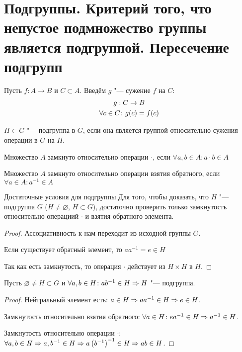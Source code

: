 \section{Подгруппы. Критерий того, что непустое подмножество группы является подгруппой. Пересечение подгрупп}
\begin{Def}
	Пусть $f: A \to B$ и $C \subset A$. Введём $g$ "--- сужение $f$ на $C$:
	\begin{gather*}
	g: C \rightarrow B \\
	\forall c \in C\colon g(c) = f(c)
	\end{gather*}
\end{Def}

\begin{Def}
	$H \subset G$ "--- подгруппа в $G$, если она является группой относительно сужения операции в $G$ на $H$.
\end{Def}


\begin{Def}
	Множество $A$ замкнуто относительно операции $\cdot$, если $\forall a, b \in A \colon a \cdot b \in A$

	Множество $A$ замкнуто относительно операции взятия обратного, если $\forall a \in A \colon a^{-1} \in A$ \\
\end{Def}

\begin{theorem}{Достаточные условия для подгруппы}
Для того, чтобы доказать, что $H$ "--- подгруппа $G$ ($H \neq \varnothing$, $H \subset G$), достаточно проверить только замкнутость относительно операциий $\cdot$ и взятия обратного элемента. \\
\end{theorem}
\begin{proof}
Ассоциативность к нам переходит из исходной группы $G$.

Если существует обратный элемент, то $a a^{-1} = e \in H$

Так как есть замкнутость, то операция $\cdot$ действует из $H \times H$ в $H$.
\end{proof}

\begin{conseq}
Пусть $\varnothing \ne H \subset G$ и $\forall a, b \in H\colon ab^{-1} \in H \Rightarrow H$ "--- подгруппа.  
\end{conseq}
\begin{proof}
Нейтральный элемент есть: $a \in H \Rightarrow aa^{-1} \in H \Rightarrow e \in H$.

Замкнутость относительно взятия обратного: $\forall a \in H \colon ea^{-1} \in H \Rightarrow a^{-1} \in H$.

Замкнутость относительно операции $\cdot$: $\forall a, b \in H \Rightarrow a, b^{-1} \in H \Rightarrow a\left(b^{-1}\right)^{-1} \in H \Rightarrow ab \in H$.
\end{proof}

